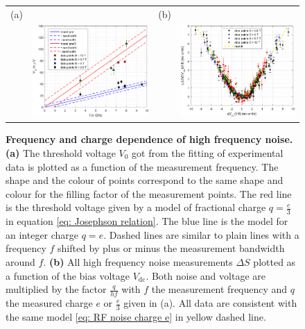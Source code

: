 \begin{figure}[hptb]
	\begin{center}
		\begin{tabular}{c c c c}
			(a) & & (b) & \\
			& \includegraphics[width = 6.5 cm]{./chap2/V_0_vs_f_for_different_nu} &
			& \includegraphics[width = 6.5 cm]{./chap2/noise_vs_V_dc_for_different_nu}
		\end{tabular}
	\end{center}
	
	\caption{\textbf{Frequency and charge dependence of high frequency noise.} \textbf{(a)} The threshold voltage $V_{0}$ got from the fitting of experimental data is plotted as a function of the measurement frequency. The shape and the colour of points correspond to the same shape and colour for the filling factor of the measurement points. The red line is the threshold voltage given by a model of fractional charge $q = \frac{e}{3}$ in equation \eqref{eq: Josephson relation}. The blue line is the model for an integer charge $q = e$. Dashed lines are similar to plain lines with a frequency $f$ shifted by plus or minus the measurement bandwidth around $f$. \textbf{(b)} All high frequency noise measurements $\Delta S$ plotted as a function of the bias voltage $V_{\mathrm{dc}}$. Both noise and voltage are multiplied by the factor $\frac{q}{hf}$ with $f$ the measurement frequency and $q$ the measured charge $e$ or $\frac{e}{3}$ given in (a). All data are consistent with the same model \eqref{eq: RF noise charge e} in yellow dashed line.}
	\label{fig: charac for all nu}
\end{figure}

